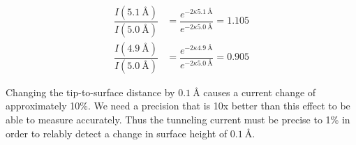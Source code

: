 \documentclass[12pt]{article}
\renewcommand{\=}[1]{\stackrel{#1}{=}} %
\theoremstyle{definition}
\theoremstyle{remark}
\begin{document}
\begin{align*}
	\dfrac{I(\SI{5.1}{\angstrom})}{I(\SI{5.0}{\angstrom})} &= \dfrac{e^{-2\kappa \SI{5.1}{\angstrom}}}{e^{-2\kappa \SI{5.0}{\angstrom}}}
		= 1.105\\[4mm]
	\dfrac{I(\SI{4.9}{\angstrom})}{I(\SI{5.0}{\angstrom})} &= \dfrac{e^{-2\kappa \SI{4.9}{\angstrom}}}{e^{-2\kappa \SI{5.0}{\angstrom}}}
		= 0.905
\end{align*}

Changing the tip-to-surface distance by $\SI{0.1}{\angstrom}$ causes a current change of approximately 10\%. We need a precision that is 10x better than this effect to be able to measure accurately. Thus the tunneling current must be precise to 1\% in order to relably detect a change in surface height of $\SI{0.1}{\angstrom}$.
\end{document}
